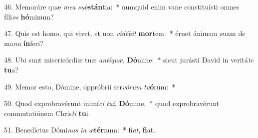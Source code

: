 46. Memoráre quæ \textit{me}\textit{a} \textit{sub}\textbf{stán}tia:~*  numquid enim vane constituísti omnes fíli\textit{os} \textbf{hó}minum?\

47. Quis est homo, qui vivet, et non \textit{vi}\textit{dé}\textit{bit} \textbf{mor}tem:~*  éruet ánimam suam de ma\textit{nu} \textbf{ín}feri?\

48. Ubi sunt misericórdiæ tuæ \textit{an}\textit{tí}\textit{quæ}, \textbf{Dó}mine:~*  sicut jurásti David in veritá\textit{te} \textbf{tu}a?\

49. Memor esto, Dómine, oppróbrii ser\textit{vó}\textit{rum} \textit{tu}\textbf{ó}rum:~*  \

50. Quod exprobravérunt inimí\textit{ci} \textit{tu}\textit{i}, \textbf{Dó}mine,~*  quod exprobravérunt commutatiónem Chris\textit{ti} \textbf{tu}i.\

51. Benedíctus Dómi\textit{nus} \textit{in} \textit{æ}\textbf{tér}num:~*  fi\textit{at}, \textbf{fi}at.\

